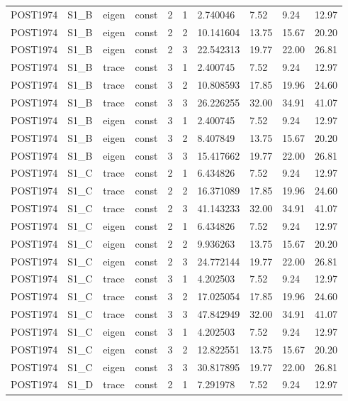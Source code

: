 \begin{tabular}{llllllllll}
POST1974 & S1\_B & eigen & const & 2 & 1 & 2.740046 & 7.52 & 9.24 & 12.97 \\
POST1974 & S1\_B & eigen & const & 2 & 2 & 10.141604 & 13.75 & 15.67 & 20.20 \\
POST1974 & S1\_B & eigen & const & 2 & 3 & 22.542313 & 19.77 & 22.00 & 26.81 \\
POST1974 & S1\_B & trace & const & 3 & 1 & 2.400745 & 7.52 & 9.24 & 12.97 \\
POST1974 & S1\_B & trace & const & 3 & 2 & 10.808593 & 17.85 & 19.96 & 24.60 \\
POST1974 & S1\_B & trace & const & 3 & 3 & 26.226255 & 32.00 & 34.91 & 41.07 \\
POST1974 & S1\_B & eigen & const & 3 & 1 & 2.400745 & 7.52 & 9.24 & 12.97 \\
POST1974 & S1\_B & eigen & const & 3 & 2 & 8.407849 & 13.75 & 15.67 & 20.20 \\
POST1974 & S1\_B & eigen & const & 3 & 3 & 15.417662 & 19.77 & 22.00 & 26.81 \\
POST1974 & S1\_C & trace & const & 2 & 1 & 6.434826 & 7.52 & 9.24 & 12.97 \\
POST1974 & S1\_C & trace & const & 2 & 2 & 16.371089 & 17.85 & 19.96 & 24.60 \\
POST1974 & S1\_C & trace & const & 2 & 3 & 41.143233 & 32.00 & 34.91 & 41.07 \\
POST1974 & S1\_C & eigen & const & 2 & 1 & 6.434826 & 7.52 & 9.24 & 12.97 \\
POST1974 & S1\_C & eigen & const & 2 & 2 & 9.936263 & 13.75 & 15.67 & 20.20 \\
POST1974 & S1\_C & eigen & const & 2 & 3 & 24.772144 & 19.77 & 22.00 & 26.81 \\
POST1974 & S1\_C & trace & const & 3 & 1 & 4.202503 & 7.52 & 9.24 & 12.97 \\
POST1974 & S1\_C & trace & const & 3 & 2 & 17.025054 & 17.85 & 19.96 & 24.60 \\
POST1974 & S1\_C & trace & const & 3 & 3 & 47.842949 & 32.00 & 34.91 & 41.07 \\
POST1974 & S1\_C & eigen & const & 3 & 1 & 4.202503 & 7.52 & 9.24 & 12.97 \\
POST1974 & S1\_C & eigen & const & 3 & 2 & 12.822551 & 13.75 & 15.67 & 20.20 \\
POST1974 & S1\_C & eigen & const & 3 & 3 & 30.817895 & 19.77 & 22.00 & 26.81 \\
POST1974 & S1\_D & trace & const & 2 & 1 & 7.291978 & 7.52 & 9.24 & 12.97 \\

\end{tabular}
